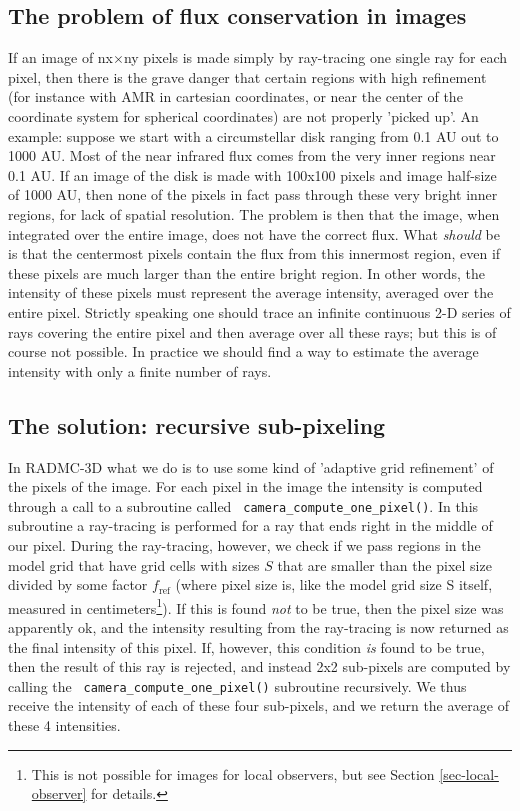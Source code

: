 \documentclass{report}
\begin{document}
\subsection{The problem of flux conservation in images}
If an image of nx$\times$ny pixels is made simply by ray-tracing one single
ray for each pixel, then there is the grave danger that certain regions with
high refinement (for instance with AMR in cartesian coordinates, or near the
center of the coordinate system for spherical coordinates) are not properly
'picked up'. An example: suppose we start with a circumstellar disk ranging
from 0.1 AU out to 1000 AU. Most of the near infrared flux comes from the
very inner regions near 0.1 AU. If an image of the disk is made with 100x100
pixels and image half-size of 1000 AU, then none of the pixels in fact pass
through these very bright inner regions, for lack of spatial resolution.
The problem is then that the image, when integrated over the entire image,
does not have the correct flux. What {\em should} be is that the centermost
pixels contain the flux from this innermost region, even if these pixels are
much larger than the entire bright region. In other words, the intensity of
these pixels must represent the average intensity, averaged over the entire
pixel. Strictly speaking one should trace an infinite continuous 2-D series
of rays covering the entire pixel and then average over all these rays; but
this is of course not possible. In practice we should find a way to estimate
the average intensity with only a finite number of rays.


\subsection{The solution: recursive sub-pixeling}
\label{sec-recursive-subpixeling}
%
In RADMC-3D what we do is to use some kind of 'adaptive grid refinement' of
the pixels of the image. For each pixel in the image the intensity is
computed through a call to a subroutine called {\small\tt
  camera\_compute\_one\_pixel()}. In this subroutine a ray-tracing is
performed for a ray that ends right in the middle of our pixel. During the
ray-tracing, however, we check if we pass regions in the model grid that
have grid cells with sizes $S$ that are smaller than the pixel size divided
by some factor $f_{\mathrm{ref}}$ (where pixel size is, like the model grid
size S itself, measured in centimeters\footnote{This is not possible for
  images for local observers, but see Section \ref{sec-local-observer} for
  details.}). If this is found {\em not} to be true, then the pixel size was
apparently ok, and the intensity resulting from the ray-tracing is now
returned as the final intensity of this pixel. If, however, this condition
{\em is} found to be true, then the result of this ray is rejected, and
instead 2x2 sub-pixels are computed by calling the {\small\tt
  camera\_compute\_one\_pixel()} subroutine recursively. We thus receive
the intensity of each of these four sub-pixels, and we return the average
of these 4 intensities. 
\end{document}
